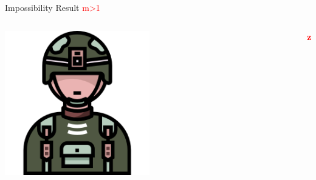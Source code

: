 \documentclass{beamer}
\begin{document}
\begin{frame}{Impossibility Result  \textcolor{red}{m>1}}
\vspace{0.5cm} %


\begin{columns}[c] %
    \begin{column}{0.3\textwidth} %
        \includegraphics[width=0.5\textwidth]{images2/soldier (1).png} %
    \end{column}
    \begin{column}{0.7\textwidth} %
        \textbf{\textcolor{red}{z}}
    \end{column}
\end{columns}

\end{frame}
\end{document}
